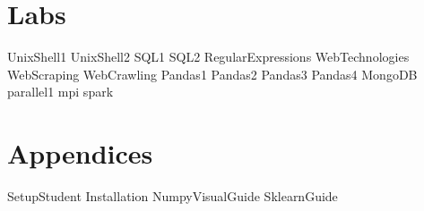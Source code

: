 \documentclass[opener-c,labs,grey,nociteref]{HJnewsiambook}
\begin{document}
\part{Labs}
{UnixShell1}
{UnixShell2}
{SQL1}
{SQL2}
{RegularExpressions}
{WebTechnologies}
{WebScraping}
{WebCrawling}
{Pandas1}
{Pandas2}
{Pandas3}
{Pandas4}
{MongoDB}
{parallel1}
{mpi}
{spark}


\part{Appendices} %
\begin{appendices}
{SetupStudent}
{Installation}
{NumpyVisualGuide}
{SklearnGuide}
\end{appendices}



\end{document}
